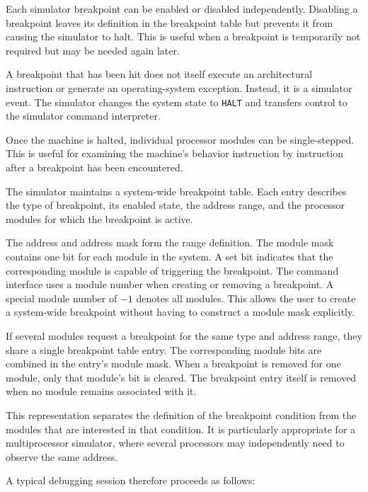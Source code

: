 
Each simulator breakpoint can be enabled or disabled independently. Disabling a breakpoint leaves its definition in the breakpoint table but prevents it from causing the simulator to halt. This is useful when a breakpoint is temporarily not required but may be needed again later.

A breakpoint that has been hit does not itself execute an architectural instruction or generate an operating-system exception. Instead, it is a simulator event. The simulator changes the system state to \texttt{HALT} and transfers control to the simulator command interpreter.

Once the machine is halted, individual processor modules can be single-stepped. This is useful for examining the machine’s behavior instruction by instruction after a breakpoint has been encountered.


The simulator maintains a system-wide breakpoint table. Each entry describes the type of breakpoint, its enabled state, the address range, and the processor modules for which the breakpoint is active.

The address and address mask form the range definition. The module mask contains one bit for each module in the system. A set bit indicates that the corresponding module is capable of triggering the breakpoint.
The command interface uses a module number when creating or removing a breakpoint. A special module number of $-1$ denotes all modules. This allows the user to create a system-wide breakpoint without having to construct a module mask explicitly.

If several modules request a breakpoint for the same type and address range, they share a single breakpoint table entry. The corresponding module bits are combined in the entry’s module mask. When a breakpoint is removed for one module, only that module’s bit is cleared. The breakpoint entry itself is removed when no module remains associated with it.

This representation separates the definition of the breakpoint condition from the modules that are interested in that condition. It is particularly appropriate for a multiprocessor simulator, where several processors may independently need to observe the same address.


A typical debugging session therefore proceeds as follows:

